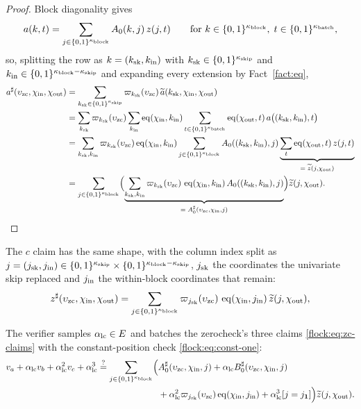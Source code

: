\begin{proof}
Block diagonality gives
\[
a(k,t)=\sum_{j\in\cube{\kblock}}A_0(k,j)\,z(j,t)\qquad\text{for }k\in\cube{\kblock},\;t\in\cube{\kbatch},
\]
so, splitting the row as $k=(\ksk,\kin)$ with $\ksk\in\cube{\kskip}$ and $\kin\in\cube{\kblock-\kskip}$ and expanding every extension by Fact~\ref{fact:eq},
\begin{align*}
\qext a(\zskip,\fc_{\mathrm{in}},\fc_{\mathrm{out}})&=\sum_{\ksk\in\cube{\kskip}}\lag_{\ksk}(\zskip)\,\mle a(\ksk,\fc_{\mathrm{in}},\fc_{\mathrm{out}})\\
&=\sum_{\ksk}\lag_{\ksk}(\zskip)\sum_{\kin}\eq(\fc_{\mathrm{in}},\kin)\sum_{t\in\cube{\kbatch}}\eq(\fc_{\mathrm{out}},t)\,a\bigl((\ksk,\kin),t\bigr)\\
&=\sum_{\ksk,\kin}\lag_{\ksk}(\zskip)\eq(\fc_{\mathrm{in}},\kin)\sum_{j\in\cube{\kblock}}A_0((\ksk,\kin),j)\underbrace{\sum_{t}\eq(\fc_{\mathrm{out}},t)\,z(j,t)}_{=\;\mle z(j,\fc_{\mathrm{out}})}\\
&=\sum_{j\in\cube{\kblock}}\Bigl(\underbrace{\sum_{\ksk,\kin}\lag_{\ksk}(\zskip)\,\eq(\fc_{\mathrm{in}},\kin)\,A_0((\ksk,\kin),j)}_{=\;\qext A_0(\zskip,\fc_{\mathrm{in}},j)}\Bigr)\mle z(j,\fc_{\mathrm{out}}).
\end{align*}
\end{proof}

The $c$ claim has the same shape, with the column index split as $j=(\jsk,\jin) \in\cube{\kskip} \times \cube{\kblock-\kskip}$, $\jsk$ the coordinates the univariate skip replaced and $\jin$ the within-block coordinates that remain:
\begin{equation}\label{flock:eq:c-as-column}
\qext z(\zskip,\fc_{\mathrm{in}},\fc_{\mathrm{out}})=\sum_{j\in\cube{\kblock}}\lag_{\jsk}(\zskip)\,\eq(\fc_{\mathrm{in}},\jin)\,\mle z(j,\fc_{\mathrm{out}}),
\end{equation}

\vspace{3mm}

The verifier samples $\lcalpha\in\E$ and batches the zerocheck's three claims \eqref{flock:eq:zc-claims} with the constant-position check \eqref{flock:eq:const-one}:
\begin{equation}\label{flock:eq:lincheck}
\begin{split}
v_a+\lcalpha v_b+\lcalpha^2v_c+\lcalpha^3\qeq\sum_{j\in\cube{\kblock}}\Bigl(&\qext A_0(\zskip,\fc_{\mathrm{in}},j)+\lcalpha\qext B_0(\zskip,\fc_{\mathrm{in}},j)\\
&+\lcalpha^2\lag_{\jsk}(\zskip)\eq(\fc_{\mathrm{in}},\jin)+\lcalpha^3[j=\jconst]\Bigr)\mle z(j,\fc_{\mathrm{out}}).
\end{split}
\end{equation}

